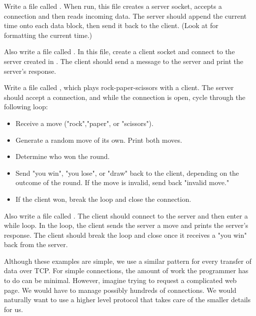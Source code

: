 \begin{problem}
Write a file called . When run, this file creates a server socket, accepts a connection and then reads incoming data. The server should append the current time onto each data block, then send it back to the client. (Look at   for formatting the current time.)

Also write a file called . In this file, create a client socket and connect to the server created in . The client should send a message to the server and print the server's response.
\end{problem}

\begin{problem}
Write a file called , which plays rock-paper-scissors with a client. The server should accept a connection, and while the connection is open, cycle through the following loop: 
\begin {itemize}
	\item{Receive a move ("rock","paper", or "scissors").}
	\item{Generate a random move of its own. Print both moves.}
	\item{Determine who won the round.}
	\item{Send "you win", "you lose", or "draw" back to the client, depending on the outcome of the round. If the move is invalid, send back "invalid move."}
	\item{If the client won, break the loop and close the connection.}
\end{itemize}

Also write a file called . The client should connect to the server and then enter a while loop. In the loop, the client sends the server a move and prints the server's response. The client should break the loop and close once it receives a "you win" back from the server.
\end{problem}

Although these examples are simple, we use a similar pattern for every transfer of data over TCP.
For simple connections, the amount of work the programmer has to do can be minimal.
However, imagine trying to request a complicated web page.
We would have to manage possibly hundreds of connections.
We would naturally want to use a higher level protocol that takes care of the smaller details for us.


